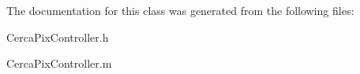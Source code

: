 The documentation for this class was generated from the following files\-:\begin{DoxyCompactItemize}
\item 
Cerca\-Pix\-Controller.\-h\item 
Cerca\-Pix\-Controller.\-m\end{DoxyCompactItemize}
